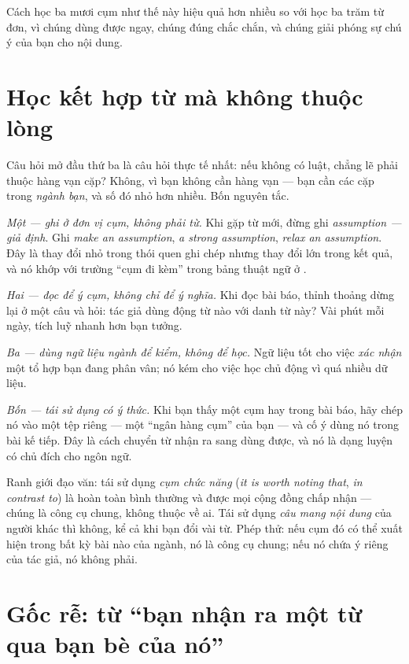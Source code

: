 \documentclass[../../english.tex]{subfiles}
\begin{document}
Cách học ba mươi cụm như thế này hiệu quả hơn nhiều so với học ba trăm từ đơn, vì chúng dùng được ngay, chúng đúng chắc chắn, và chúng giải phóng sự chú ý của bạn cho nội dung.

\section{Học kết hợp từ mà không thuộc lòng}

Câu hỏi mở đầu thứ ba là câu hỏi thực tế nhất: nếu không có luật, chẳng lẽ phải thuộc hàng vạn cặp? Không, vì bạn không cần hàng vạn --- bạn cần các cặp trong \emph{ngành bạn}, và số đó nhỏ hơn nhiều. Bốn nguyên tắc.

\emph{Một --- ghi ở đơn vị cụm, không phải từ.} Khi gặp từ mới, đừng ghi \emph{assumption --- giả định}. Ghi \emph{make an assumption}, \emph{a strong assumption}, \emph{relax an assumption}. Đây là thay đổi nhỏ trong thói quen ghi chép nhưng thay đổi lớn trong kết quả, và nó khớp với trường ``cụm đi kèm'' trong bảng thuật ngữ ở .

\emph{Hai --- đọc để ý cụm, không chỉ để ý nghĩa.} Khi đọc bài báo, thỉnh thoảng dừng lại ở một câu và hỏi: tác giả dùng động từ nào với danh từ này? Vài phút mỗi ngày, tích luỹ nhanh hơn bạn tưởng.

\emph{Ba --- dùng ngữ liệu ngành để kiểm, không để học.} Ngữ liệu tốt cho việc \emph{xác nhận} một tổ hợp bạn đang phân vân; nó kém cho việc học chủ động vì quá nhiều dữ liệu.

\emph{Bốn --- tái sử dụng có ý thức.} Khi bạn thấy một cụm hay trong bài báo, hãy chép nó vào một tệp riêng --- một ``ngân hàng cụm'' của bạn --- và cố ý dùng nó trong bài kế tiếp. Đây là cách chuyển từ nhận ra sang dùng được, và nó là dạng luyện có chủ đích cho ngôn ngữ.

\begin{cannho}
Ranh giới đạo văn: tái sử dụng \emph{cụm chức năng} (\emph{it is worth noting that}, \emph{in contrast to}) là hoàn toàn bình thường và được mọi cộng đồng chấp nhận --- chúng là công cụ chung, không thuộc về ai. Tái sử dụng \emph{câu mang nội dung} của người khác thì không, kể cả khi bạn đổi vài từ. Phép thử: nếu cụm đó có thể xuất hiện trong bất kỳ bài nào của ngành, nó là công cụ chung; nếu nó chứa ý riêng của tác giả, nó không phải.
\end{cannho}

\section{Gốc rễ: từ ``bạn nhận ra một từ qua bạn bè của nó''}
\end{document}
